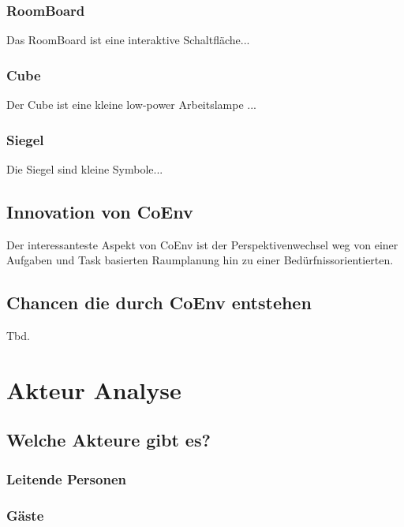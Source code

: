 \documentclass{article}
\begin{document}
\newpage

\subsubsection*{RoomBoard} 

Das RoomBoard ist eine interaktive Schaltfläche...

\subsubsection*{Cube}

Der Cube ist eine kleine low-power Arbeitslampe ...

\subsubsection*{Siegel}

Die Siegel sind kleine Symbole...

\subsection{Innovation von CoEnv}

Der interessanteste Aspekt von CoEnv ist der Perspektivenwechsel weg von einer Aufgaben und Task basierten Raumplanung hin zu einer Bedürfnissorientierten.


\subsection{Chancen die durch CoEnv entstehen}

Tbd.

\section{Akteur Analyse}

\subsection{Welche Akteure gibt es?}

\subsubsection{Leitende Personen}
\subsubsection{Gäste}
\end{document}

